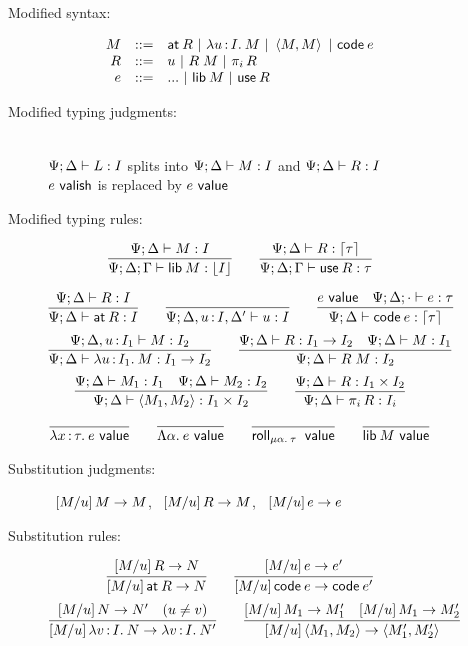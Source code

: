 \documentclass[11pt]{article}
\begin{document}
\begin{figure}[p]
  \centering
  \begin{description}
    \item[Modified syntax:]
      \[\begin{array}{rcl}
        M &::=& \textsf{at}\:{R} ~|~ \lambda u \mathop{:} I .\: M ~|~ \left\langle M,M\right\rangle ~|~ \textsf{code}\:{e}\\
        R &::=& u ~|~ R \; M ~|~ \pi_{i} \, R\\
        e &::=& ... ~|~ \textsf{lib}\:{M} ~|~ \textsf{use}\:{R}
      \end{array}\]


    \item[Modified typing judgments:]\hfill\\
      $\Psi;\Delta \vdash L : I$ splits into $\Psi;\Delta \vdash M : I$ and $\Psi;\Delta
      \vdash R : I$\\
      $e ~\textsf{valish}$ is replaced by $e ~\textsf{value}$

    \item[Modified typing rules:]
      \[
      \infer{\Psi;\D;\G \ent \lib{M} \isa \dn{I}}{\Psi;\D \ent M \isa I} \qquad
      \infer{\Psi;\D;\G \ent \use{R} \isa \tau}{\Psi;\D \ent R \isa \up{\tau}}
      \]

      \[
      \infer{\Psi;\D \ent \at{R} \isa I}{\Psi;\D \ent R \isa I} \qquad
      \infer{\Psi;\D,u \of I,\D' \ent u \isa I}{} \qquad
      \infer{\Psi;\D \ent \code{e} \isa \up{\tau}}{
        e \isvalue &
        \Psi;\D;\ecx \ent e \isa \tau}
      \]\[
      \infer{\Psi;\D \ent \lam{u}{I_1}{M} \isa I_1 \to I_2}{
        \Psi;\D, u \of I_1 \ent M \isa I_2}
      \qquad
      \infer{\Psi;\D \ent R \ap M \isa I_2}{
        \Psi;\D \ent R \isa I_1 \to I_2 &
        \Psi;\D \ent M \isa I_1}
      \]\[
      \infer{\Psi;\D \ent \<M_1, M_2\> \isa I_1 \x I_2}{
        \Psi;\D \ent M_1 \isa I_1 &
        \Psi;\D \ent M_2 \isa I_2} \qquad
      \infer{\Psi;\D \ent \proj{i}{R} \isa I_i}{
        \Psi;\D \ent R \isa I_1 \x I_2}
      \]

      \[
      \infer{\lam{x}{\tau}{e} \isvalue}{} \qquad
      \infer{\Lam{\alpha}{e} \isvalue}{} \qquad
      \infer{\roll{\alpha}{\tau} \isvalue}{} \qquad
      \infer{\lib{M} \isvalue}{}
      \]

    \item[Substitution judgments:] \ 
      $[{{M}/{u}}]\,{M} \to M$, \ $[{{M}/{u}}]\,{R} \to M$, \ $[{{M}/{u}}]\,{e} \to e$

    \item[Substitution rules:]
      \[
      \infer{\sub{M}{u}{\at{R}} \to N}{\sub{M}{u}{R} \to N} \qquad
      \infer{\sub{M}{u}{\code{e}} \to \code{e'}}{
        \sub{M}{u}{e} \to e'}
      \]\[
      \infer{\sub{M}{u}{\lam{v}{I}{N}} \to \lam{v}{I}{N'}}{
        \sub{M}{u}{N} \to N' &
        (u \ne v)} \qquad
      \infer{\sub{M}{u}{\<M_1, M_2\>} \to \<M_1', M_2'\>}{
        \sub{M}{u}{M_1} \to M_1' &
        \sub{M}{u}{M_1} \to M_2'}
      \]


\end{description}
\end{figure}
\end{document}
